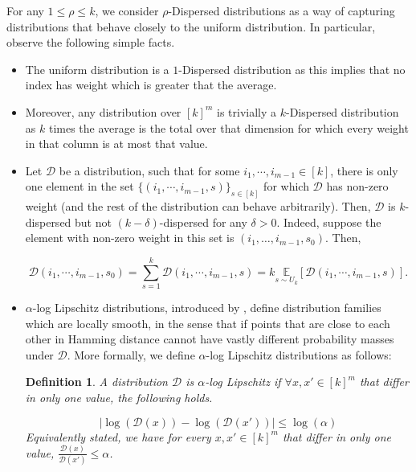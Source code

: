 \documentclass[11pt]{article}
\newtheorem{definition}{Definition}[section]
\newcommand{\sD}{\mathcal{D}}
\begin{document}
For any $1 \leq \rho \leq k$, we consider $\rho$-Dispersed distributions as a way of capturing distributions that behave closely to the uniform distribution. In particular, observe the following simple facts.
\begin{itemize}
    \item The uniform distribution is a $1$-Dispersed distribution as this implies that no index has weight which is greater that the average.
    \item  Moreover, any distribution over $[k]^{m}$ is trivially a $k$-Dispersed distribution as $k$ times the average is the total over that dimension for which every weight in that column is at most that value. 
    \item Let $\sD$ be a distribution, such that for some $i_{1},\cdots, i_{m-1}\in [k]$, there is only one element in the set $\{(i_{1},\cdots, i_{m-1},s)\}_{s\in [k]}$ for which $\sD$ has non-zero weight (and the rest of the distribution can behave arbitrarily). Then, $\sD$ is $k$-dispersed but not $(k-\delta)$-dispersed for any $\delta>0$. Indeed, suppose the element with non-zero weight in this set is $(i_1, \dots, i_{m-1},s_{0})$. Then, 
    
    \begin{equation*}
    \sD(i_{1},\cdots, i_{m-1},s_{0})=\sum_{s=1}^{k}\sD(i_{1},\cdots, i_{m-1},s)=k\underset{s\sim U_{k}}{\mathbb{E}}[\sD(i_{1},\cdots, i_{m-1},s)].
    \end{equation*}
    
    \item $\alpha$-log Lipschitz distributions, introduced by \cite{AFK13}, define distribution families which are locally smooth, in the sense that if points that are close to each other in Hamming distance cannot have vastly different probability masses under $\sD$. More formally, we define $\alpha$-log Lipschitz distributions as follows:

    \begin{definition}
    A distribution $\sD$ is $\alpha$-log Lipschitz if $\forall x,x'\in [k]^{m}$ that differ in only one value, the following holds.

    \begin{equation*}
        |\log(\sD(x))-\log(\sD(x'))|\leq \log (\alpha)
    \end{equation*}
    Equivalently stated, we have for every $x,x'\in [k]^{m}$ that differ in only one value, $\frac{\sD(x)}{\sD(x')}\leq \alpha$.
    \end{definition}


\end{itemize}
\end{document}
